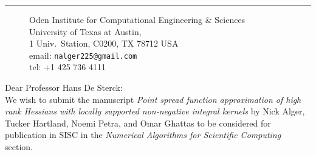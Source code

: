 \documentclass[11pt]{article}
\begin{document}
\pagestyle{empty}
 \begin{figure}
 \begin{minipage}{.5\columnwidth}
 \end{minipage}\hfill
 \begin{minipage}[b]{.48\columnwidth}
\flushright
 \vspace{-0.9cm}
 \end{minipage}
 \end{figure}
 \noindent\rule{\columnwidth}{.5pt}\vspace{-2ex}
 \begin{figure}[h]
 \begin{minipage}{.2\columnwidth}
 \end{minipage}\hfill
 \begin{minipage}{.78\columnwidth}
 \flushright\vspace{-2ex}
 {\noindent Oden Institute for Computational Engineering \& Sciences \\ 
 University of Texas at Austin, \\ 
 1 Univ.\ Station, C0200,
 TX 78712 USA \\
 email: {\tt nalger225@gmail.com}\\
 tel: +1 425 736 4111}\\
 \end{minipage}
 \end{figure}
\phantom{adafdsf}
\vspace{3ex}

\noindent Dear Professor Hans De Sterck:\\[2ex] 

We wish to submit the manuscript {\em Point spread function approximation of high rank Hessians with locally supported non-negative integral kernels} by Nick Alger, Tucker Hartland, Noemi Petra, and Omar Ghattas to be considered for publication in SISC in the {\em
  Numerical Algorithms for Scientific Computing} section.
%
\end{document}
